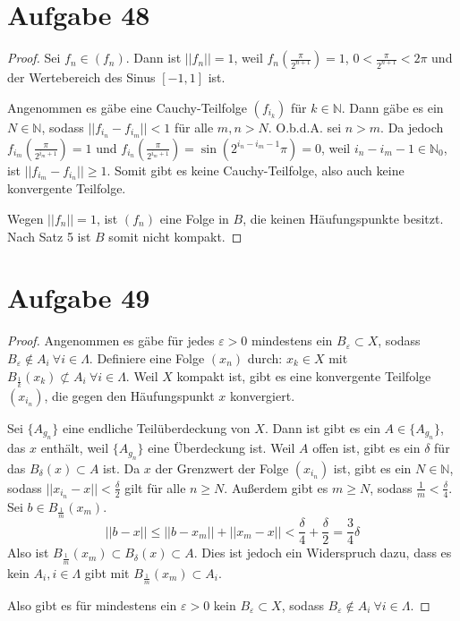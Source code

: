 \documentclass[10pt,a4paper]{article}
\begin{document}
\section{Aufgabe 48}

\begin{proof}
  Sei $f_{n} \in (f_{n})$.
  Dann ist $||f_{n}|| = 1$, weil $f_{n}(\frac{\pi}{2^{n + 1}}) = 1$, $0 < \frac{\pi}{2^{n + 1}} < 2\pi$ und der Wertebereich des Sinus $[-1, 1]$ ist.

  Angenommen es gäbe eine Cauchy-Teilfolge $(f_{i_{k}})$ für $k \in \mathbb{N}$.
  Dann gäbe es ein $N \in \mathbb{N}$, sodass $||f_{i_{n}} - f_{i_{m}}|| < 1$ für alle $m, n > N$.
  O.b.d.A. sei $n > m$.
  Da jedoch $f_{i_{m}}(\frac{\pi}{2^{i_{m} + 1}}) = 1$ und $f_{i_{n}}(\frac{\pi}{2^{i_{m} + 1}}) = \sin(2^{i_{n} - i_{m} - 1}\pi) = 0$, weil $i_{n} - i_{m} - 1 \in \mathbb{N}_{0}$, ist $||f_{i_{m}} - f_{i_{n}}|| \ge 1$.
  Somit gibt es keine Cauchy-Teilfolge, also auch keine konvergente Teilfolge.

  Wegen $||f_{n}|| = 1$, ist $(f_{n})$ eine Folge in $B$, die keinen Häufungspunkte besitzt.
  Nach Satz 5 ist $B$ somit nicht kompakt.
\end{proof}

\section{Aufgabe 49}

\begin{proof}
  Angenommen es gäbe für jedes $\varepsilon > 0$ mindestens ein $B_{\varepsilon} \subset X$, sodass $B_{\varepsilon} \notin A_{i}\ \forall i \in \Lambda$.
  Definiere eine Folge $(x_{n})$ durch: $x_{k} \in X$ mit $B_{\frac{1}{k}}(x_{k}) \not\subset A_{i}\ \forall i \in \Lambda$.
  Weil $X$ kompakt ist, gibt es eine konvergente Teilfolge $(x_{i_{n}})$, die gegen den Häufungspunkt $x$ konvergiert.

  Sei $\{ A_{g_{n}} \}$ eine endliche Teilüberdeckung von $X$.
  Dann ist gibt es ein $A \in \{ A_{g_{n}} \}$, das $x$ enthält, weil $\{ A_{g_{n}} \}$ eine Überdeckung ist.
  Weil $A$ offen ist, gibt es ein $\delta$ für das $B_{\delta}(x) \subset A$ ist.
  Da $x$ der Grenzwert der Folge $(x_{i_{n}})$ ist, gibt es ein $N \in \mathbb{N}$, sodass $||x_{i_{n}} - x|| < \frac{\delta}{2}$ gilt für alle $n \ge N$.
  Außerdem gibt es $m \ge N$, sodass $\frac{1}{m} < \frac{\delta}{4}$.
  Sei $b \in B_{\frac{1}{m}}(x_{m})$.
  \begin{equation}
    ||b - x|| \le ||b - x_{m}|| + ||x_{m} - x|| < \frac{\delta}{4} + \frac{\delta}{2} = \frac{3}{4}\delta
  \end{equation}
  Also ist $B_{\frac{1}{m}}(x_{m}) \subset B_{\delta}(x) \subset A$.
  Dies ist jedoch ein Widerspruch dazu, dass es kein $A_{i}, i \in \Lambda$ gibt mit $B_{\frac{1}{m}}(x_{m}) \subset A_{i}$.

  Also gibt es für mindestens ein $\varepsilon > 0$ kein $B_{\varepsilon} \subset X$, sodass $B_{\varepsilon} \notin A_{i}\ \forall i \in \Lambda$.
\end{proof}
\end{document}
